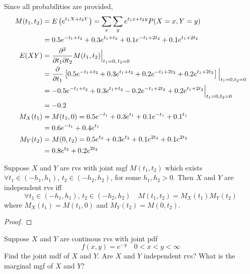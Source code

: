 \documentclass[notoc,notitlepage]{tufte-book}
\begin{document}
\begin{solution}
  Since all probabilities are provided,
  \begin{align*}
    M(t_1, t_2) &= E\left( e^{t_1 X + t_2 Y} \right) = \sum_{x} \sum_{y} e^{t_1 x + t_2 y} P(X = x, Y = y) \\
      &= 0.5 e^{-t_1 + t_2} + 0.3 e^{t_1 + t_2} + 0.1 e^{-t_1 + 2t_2} + 0.1 e^{t_1 + 2t_2} \\
    E(XY) &= \frac{\partial^2}{\partial t_1 \partial t_2} M(t_1, t_2) \Big|_{t_1 = 0, \, t_2 = 0}^{} \\
      &= \frac{\partial}{\partial t_1} \left[ 0.5 e^{-t_1 + t_2} + 0.3 e^{t_1 + t_2} + 0.2 e^{-t_1 + 2t_2} + 0.2e^{t_1 + 2t_2} \right] \Big|_{t_1 = 0, t_2 = 0}^{} \\
      &= -0.5 e^{-t_1 + t_2} + 0.3e^{t_1 + t_2} - 0.2 e^{-t_1 + 2t_2} + 0.2e^{t_1 + 2t_2} \Big|_{t_1 = 0, t_2 = 0}^{} \\
      &= -0.2 \\
    M_X(t_1) &= M(t_1, 0) = 0.5e^{-t_1} + 0.3e^{t_1} + 0.1 e^{-t_1} + 0.1^{t_1} \\
      &= 0.6e^{-t_1} + 0.4 e^{t_1} \\
    M_Y(t_2) &= M(0, t_2) = 0.5e^{t_2} + 0.3e^{t_2} + 0.1 e^{2t_2} + 0.1 e^{2t_2} \\
      &= 0.8 e^{t_2} + 0.2 e^{2t_2}
  \end{align*}
\end{solution}

\begin{propo}
\label{propo:independence_on_joint_mgf}
  Suppose $X$ and $Y$ are rvs with joint mgf $M(t_1, t_2)$ which exists $\forall t_1 \in (-h_1, h_1), \, t_2 \in (-h_2, h_2)$, for some $h_1, h_2 > 0$. Then $X$ and $Y$ are independent rvs iff
  \begin{equation*}
    \forall t_1 \in (-h_1, h_1), \, t_2 \in (-h_2, h_2) \quad M(t_1, t_2) = M_X(t_1) M_Y(t_2)
  \end{equation*}
  where $M_X(t_1) = M(t_1, 0)$ and $M_Y(t_2) = M(0, t_2)$.
\end{propo}

\begin{proof}
\end{proof}

\begin{eg}
  Suppose $X$ and $Y$ are continous rvs with joint pdf
  \begin{equation*}
    f(x, y) = e^{-y} \quad 0 < x < y < \infty
  \end{equation*}
  Find the joint mdf of $X$ and $Y$. Are $X$ and $Y$ independent rvs? What is the marginal mgf of $X$ and $Y$?
\end{eg}
\end{document}
